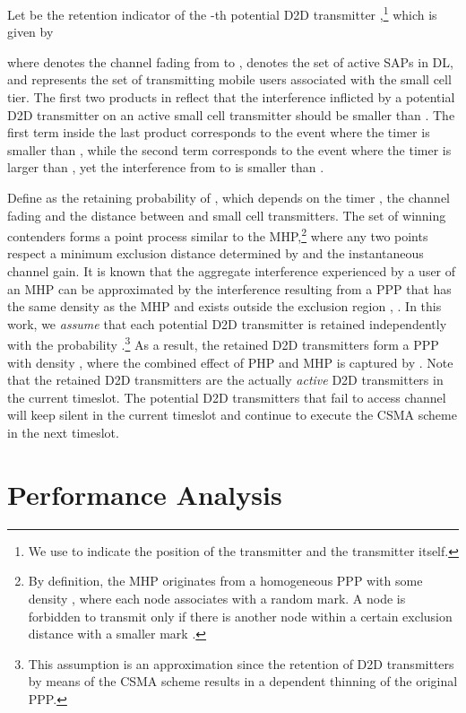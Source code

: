 \documentclass[twocolumn,english]{IEEEtran}
\theoremstyle{plain}
\theoremstyle{definition}
\begin{document}
Let  be the retention indicator of the -th potential D2D
transmitter ,\footnote{We use  to indicate the position of the transmitter and the
transmitter itself.} which is given by

where  denotes the channel fading from  to ,
 denotes the set of active
SAPs in DL, and 
represents the set of transmitting mobile users associated with the
small cell tier. The first two products in  reflect
that the interference inflicted by a potential D2D transmitter on
an active small cell transmitter should be smaller than .
The first term inside the last product corresponds to the event where
the timer  is smaller than , while the second term
corresponds to the event where the timer  is larger than ,
yet the interference from  to  is smaller than .

Define  as the retaining
probability of , which depends on the timer , the
channel fading and the distance between  and small cell transmitters.
The set of winning contenders forms a point process similar to the
MHP,\footnote{By definition, the MHP originates from a homogeneous PPP with some
density , where each node associates with a random mark.
A node is forbidden to transmit only if there is another node within
a certain exclusion distance with a smaller mark \cite{MIIH}. } where any two points respect a minimum exclusion distance determined
by  and the instantaneous channel gain. It is
known that the aggregate interference experienced by a user of an
MHP can be approximated by the interference resulting from a PPP that
has the same density as the MHP and exists outside the exclusion region
\cite{MIIH}, \cite{AMHC}. In this work, we \textit{\emph{assume}}
that each potential D2D transmitter is retained independently with
the probability .\footnote{This assumption is an approximation since the retention of D2D transmitters
by means of the CSMA scheme results in a dependent thinning of the
original PPP.} As a result, the retained D2D transmitters  form
a PPP with density , where the combined
effect of PHP and MHP is captured by . Note that the retained
D2D transmitters are the actually\emph{ active} D2D transmitters in
the current timeslot. The potential D2D transmitters that fail to
access channel will keep silent in the current timeslot and continue
to execute the CSMA scheme in the next timeslot.


\section{Performance Analysis}
\end{document}
